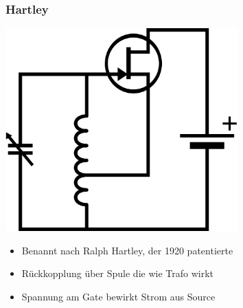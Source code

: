 \begin{frame}
    \frametitle{Hartley}
    \begin{center}
        \includegraphics[width=0.67\textwidth,height=.5\textheight,keepaspectratio]{a07/Hartley_osc.png}
	{\tiny \hyperlink{refs}{\cite{wm}}} \\[1em]
     	\begin{itemize}
			\item Benannt nach Ralph Hartley, der 1920 patentierte
			\item Rückkopplung über Spule die wie Trafo wirkt
			\item Spannung am Gate bewirkt Strom aus Source 
    	\end{itemize}
    \end{center}
\end{frame}

